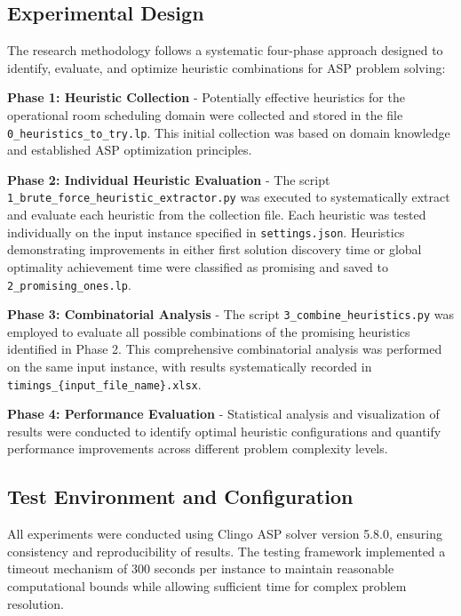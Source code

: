 \documentclass[11pt,a4paper]{article}
\begin{document}
\subsection{Experimental Design}

The research methodology follows a systematic four-phase approach designed to identify, evaluate, and optimize heuristic combinations for ASP problem solving:

\textbf{Phase 1: Heuristic Collection} - Potentially effective heuristics for the operational room scheduling domain were collected and stored in the file \texttt{0\_heuristics\_to\_try.lp}. This initial collection was based on domain knowledge and established ASP optimization principles.

\textbf{Phase 2: Individual Heuristic Evaluation} - The script \texttt{1\_brute\_force\_heuristic\_extractor.py} was executed to systematically extract and evaluate each heuristic from the collection file. Each heuristic was tested individually on the input instance specified in \texttt{settings.json}. Heuristics demonstrating improvements in either first solution discovery time or global optimality achievement time were classified as promising and saved to \texttt{2\_promising\_ones.lp}.

\textbf{Phase 3: Combinatorial Analysis} - The script \texttt{3\_combine\_heuristics.py} was employed to evaluate all possible combinations of the promising heuristics identified in Phase 2. This comprehensive combinatorial analysis was performed on the same input instance, with results systematically recorded in \texttt{timings\_\{input\_file\_name\}.xlsx}.

\textbf{Phase 4: Performance Evaluation} - Statistical analysis and visualization of results were conducted to identify optimal heuristic configurations and quantify performance improvements across different problem complexity levels.

\subsection{Test Environment and Configuration}

All experiments were conducted using Clingo ASP solver version 5.8.0, ensuring consistency and reproducibility of results. The testing framework implemented a timeout mechanism of 300 seconds per instance to maintain reasonable computational bounds while allowing sufficient time for complex problem resolution.
\end{document}
